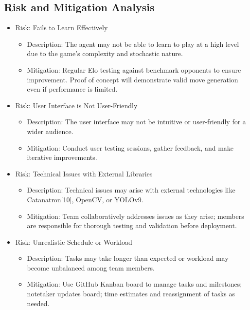 \documentclass{article}
\begin{document}
\subsection{Risk and Mitigation Analysis}\label{subsec:risk}
\begin{itemize}
    \item {Risk: \AI{} Fails to Learn Effectively}
    \begin{itemize}
        \item Description: The \AI{} agent may not be able to learn to play \emph{\Catan{}} at a high level due to the game's complexity and stochastic nature.
        \item Mitigation: Regular Elo testing against benchmark opponents to ensure improvement. Proof of concept will demonstrate valid move generation even if performance is limited.
    \end{itemize}

    \item {Risk: User Interface is Not User-Friendly}
    \begin{itemize}
        \item Description: The user interface may not be intuitive or user-friendly for a wider audience.
        \item Mitigation: Conduct user testing sessions, gather feedback, and make iterative improvements.
    \end{itemize}

    \item {Risk: Technical Issues with External Libraries}
    \begin{itemize}
        \item Description: Technical issues may arise with external technologies like Catanatron[10], OpenCV, or YOLOv9.
        \item Mitigation: Team collaboratively addresses issues as they arise; members are responsible for thorough testing and validation before deployment.
    \end{itemize}

    \item {Risk: Unrealistic Schedule or Workload}
    \begin{itemize}
        \item Description: Tasks may take longer than expected or workload may become unbalanced among team members.
        \item Mitigation: Use GitHub Kanban board to manage tasks and milestones; notetaker updates board; time estimates and reassignment of tasks as needed.
    \end{itemize}
\end{itemize}
\end{document}
